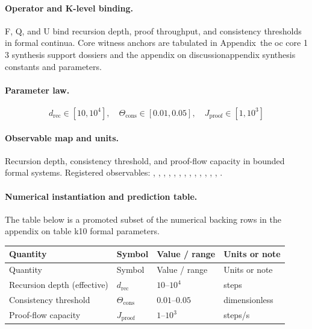 \paragraph{Operator and K-level binding.}
F, Q, and U bind recursion depth, proof throughput, and consistency thresholds in formal continua.
Core witness anchors are tabulated in Appendix~the oc core 1 3 synthesis support dossiers and the appendix on discussionappendix synthesis constants and parameters.

\paragraph{Parameter law.}
\[
d_{\mathrm{rec}} \in [10,10^4],\quad \Theta_{\mathrm{cons}} \in [0.01,0.05],\quad J_{\mathrm{proof}} \in [1,10^3]
\]

\paragraph{Observable map and units.}
Recursion depth, consistency threshold, and proof-flow capacity in bounded formal systems.
Registered observables: , \allowbreak {}, \allowbreak {}, \allowbreak {}, \allowbreak {}, \allowbreak {}, \allowbreak {}, \allowbreak {}, \allowbreak {}, \allowbreak {}, \allowbreak {}, \allowbreak {}, \allowbreak {}, \allowbreak {}.

\paragraph{Numerical instantiation and prediction table.}
The table below is a promoted subset of the numerical backing rows in the appendix on table k10 formal parameters.
\begin{longtable}{@{}L{0.27\textwidth}L{0.15\textwidth}L{0.24\textwidth}L{0.16\textwidth}@{}}
\toprule
Quantity & Symbol & Value / range & Units or note \\
\midrule
\endfirsthead
\toprule
Quantity & Symbol & Value / range & Units or note \\
\midrule
\endhead
Recursion depth (effective) & $\scriptstyle d_{\mathrm{rec}}$ & $10\text{--}10^4$ & steps \\
Consistency threshold & $\scriptstyle \Theta_{\mathrm{cons}}$ & $0.01\text{--}0.05$ & dimensionless \\
Proof-flow capacity & $\scriptstyle J_{\mathrm{proof}}$ & $1\text{--}10^3$ & steps/s \\
\bottomrule
\end{longtable}

